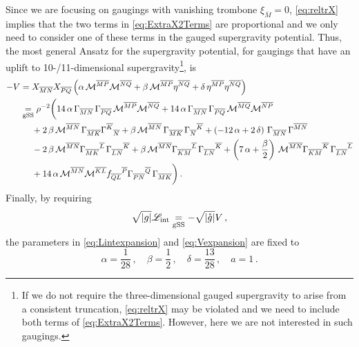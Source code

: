 \documentclass[a4paper, 11pt]{article}
\numberwithin{equation}{section}
\newcommand{\ov}[1]{\overline{#1}}
\newcommand{\+}{\oplus}
\newcommand{\fl}[1]{\ov{#1}}
\newcommand{\M}{\ensuremath{\mathcal{M}}\xspace}
\begin{document}
Since we are focusing on gaugings with vanishing trombone $\xi_{\fl{M}} = 0$, \eqref{eq:reltrX} implies that the two terms in \eqref{eq:ExtraX2Terms} are proportional and we only need to consider one of these terms in the gauged supergravity potential. Thus, the most general Ansatz for the supergravity potential, for gaugings that have an uplift to 10-/11-dimensional supergravity\footnote{If we do not require the three-dimensional gauged supergravity to arise from a consistent truncation, \eqref{eq:reltrX} may be violated and we need to include both terms of \eqref{eq:ExtraX2Terms}. However, here we are not interested in such gaugings.}, is
\begin{equation} \label{eq:Vexpansion}
	\begin{aligned}
		-V &= X_{\fl{MN}}X_{\fl{PQ}}\left(\alpha\,\M^{\fl{MP}}\M^{\fl{NQ}}+\beta\,\M^{\fl{MP}}\eta^{\fl{NQ}}+\delta\,\eta^{\fl{MP}}\eta^{\fl{NQ}}
		\right) \\
		&\underset{\rm gSS}{=} \rho^{-2}\bigg(14\,\alpha\,\Gamma_{\fl{MN}}\,\Gamma_{\fl{PQ}}\,\M^{\fl{MP}}\M^{\fl{NQ}}+14\,\alpha\,\Gamma_{\fl{MN}}\,\Gamma_{\fl{PQ}}\,\M^{\fl{MQ}}\M^{\fl{NP}}\\
		&\ \quad +2\,\beta\,\M^{\fl{MN}}\,\Gamma_{\fl{MK}}\Gamma^{\fl{K}}{}_{\fl{N}}+\beta\,\M^{\fl{MN}}\,\Gamma_{\fl{MK}}\,\Gamma_{\fl{N}}{}^{\fl{K}}+\left(-12\,\alpha+2\,\delta
		\right)\,\Gamma_{\fl{MN}}\,\Gamma^{\fl{MN}}\\
		&\ \quad -2\,\beta\,\M^{\fl{MN}}\Gamma_{\fl{MK}}{}^{\fl{L}}\,\Gamma_{\fl{LN}}{}^{\fl{K}}+\beta\,\M^{\fl{MN}}\Gamma_{\fl{KM}}{}^{\fl{L}}\,\Gamma_{\fl{LN}}{}^{\fl{K}}+\left(7\,\alpha+\frac{\beta}{2}\right)\,\M^{\fl{MN}}\Gamma_{\fl{KM}}{}^{\fl{K}}\,\Gamma_{\fl{LN}}{}^{\fl{L}}\\
		&\ \quad +14\,\alpha\,\M^{\fl{MN}}\M^{\fl{KL}}f_{\fl{QL}}{}^{\fl{P}}\Gamma_{\fl{PN}}{}^{\fl{Q}}\,\Gamma_{\fl{MK}}\bigg)\,.
	\end{aligned}
\end{equation}
Finally, by requiring
\begin{equation}
	\sqrt{|g|} \mathscr{L}_{\rm int} \underset{\rm gSS}{=} - \sqrt{|\mathring{g}|} V \,,
\end{equation}
the parameters in \eqref{eq:Lintexpansion} and \eqref{eq:Vexpansion} are fixed to
\begin{equation}
	\alpha = \frac{1}{28}\,,\quad \beta = \frac{1}{2}\,, \quad \delta=\frac{13}{28}\,, \quad a=1 \,. 
\end{equation}
\end{document}
